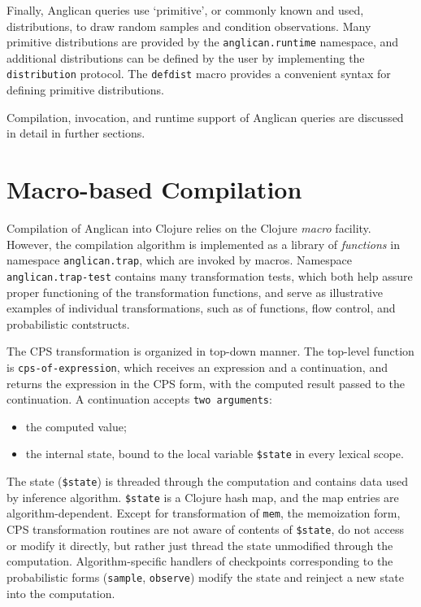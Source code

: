 \documentclass[a4paper]{article}
\begin{document}
Finally, Anglican queries use `primitive', or commonly known
and used, distributions, to draw random samples and condition
observations. Many primitive distributions are provided by the
\texttt{anglican.runtime} namespace, and additional
distributions can be defined by the user by implementing the
\texttt{distribution} protocol. The \texttt{defdist} macro
provides a convenient syntax for defining primitive distributions.

Compilation, invocation, and runtime support of Anglican queries
are discussed in detail in further sections.

\section{Macro-based Compilation}

Compilation of Anglican into Clojure relies on the Clojure
\textit{macro} facility. However, the compilation algorithm is
implemented as a library of \textit{functions} in namespace
\texttt{anglican.trap}, which are invoked by macros. Namespace
\texttt{anglican.trap-test} contains many transformation tests,
which both help assure proper functioning of the transformation
functions, and serve as illustrative examples of individual
transformations, such as of functions, flow control, and
probabilistic contstructs.

The CPS transformation is organized in top-down manner. The
top-level function is  \texttt{cps-of-expression}, which
receives an expression and a continuation, and returns the
expression in the CPS form, with the computed result passed to
the continuation. A continuation accepts \texttt{two arguments}:
\begin{itemize}
	\item the computed value;
	\item the internal state, bound to the local variable
		\texttt{\$state} in every lexical scope.
\end{itemize}
The state (\texttt{\$state}) is threaded through the computation
and contains data used by inference algorithm. \texttt{\$state}
is a Clojure hash map, and the map entries are
algorithm-dependent. Except for transformation of
\texttt{mem}, the memoization form, CPS transformation routines
are not aware of contents of \texttt{\$state}, do not access or
modify it directly, but rather just thread the state unmodified
through the computation. Algorithm-specific handlers of
checkpoints corresponding to the probabilistic forms
(\texttt{sample}, \texttt{observe}) modify the
state and reinject a new state into the computation.
\end{document}
